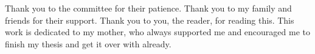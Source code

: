 
Thank you to the committee for their patience.
Thank you to my family and friends for their support.
Thank you to you, the reader, for reading this.
This work is dedicated to my mother, who always supported me and encouraged me to finish my thesis and get it over with already.